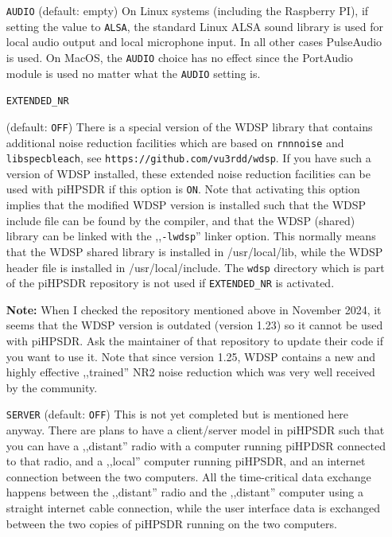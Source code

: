 \documentclass[12pt]{book}
\def\rett#1{\texttt{\color{red}#1}}
\def\pH{pi\-HPSDR\xspace}
\begin{document}
\begin{itemize}
\item[\rett{AUDIO}] {(default: empty)
On Linux systems (including the Raspberry PI), if setting the value to \texttt{ALSA},
the standard Linux ALSA sound library is used for local audio
output and local microphone input. In all other cases
PulseAudio is used. On MacOS, the \texttt{AUDIO} choice has no effect since the PortAudio
module is used no matter what the \texttt{AUDIO} setting is.
}

\item[\rett{EXTENDED\_NR}] {(default: \texttt{OFF})
There is a special version of the WDSP library that contains additional noise
reduction facilities which are based on  \texttt{rnnnoise} and \texttt{libspecbleach}, see
 \texttt{https://github.com/vu3rdd/wdsp}. If you have such a version of WDSP installed, these
 extended noise reduction facilities can be used with \pH if this option is \texttt{ON}.
 Note that activating this option implies that the modified WDSP version is installed such
 that the WDSP include file can be found by the compiler, and that the WDSP (shared)
 library can be linked with the ,,\texttt{-lwdsp}'' linker option. This normally means
 that the WDSP shared library is installed in /usr/local/lib, while the WDSP header file
 is installed in /usr/local/include. The \texttt{wdsp} directory which is part of
 the \pH repository is not used if \texttt{EXTENDED\_NR} is activated.

{\bf Note:} When I  checked the repository mentioned above in November 2024, it seems that the
WDSP version is outdated (version 1.23) so it cannot be used with \pH. Ask the maintainer
of that repository to update their code if you want to use it. Note that since version 1.25, WDSP
contains a new and highly effective ,,trained'' NR2 noise reduction which was very well
received by the community.
}

\item[\rett{SERVER}] {(default: \texttt{OFF})
 This is not yet completed but is mentioned here anyway. There are plans to have
 a client/server model in \pH such that you can have a ,,distant'' radio with a computer
 running piHPDSR connected to that radio, and a ,,local'' computer running \pH, and an
 internet connection between the two computers. All the time-critical data exchange happens
 between the ,,distant'' radio and the ,,distant'' computer using a straight internet
 cable connection, while the user interface data is exchanged between the two copies of
 \pH running on the two computers.
}

\end{itemize}
\end{document}
